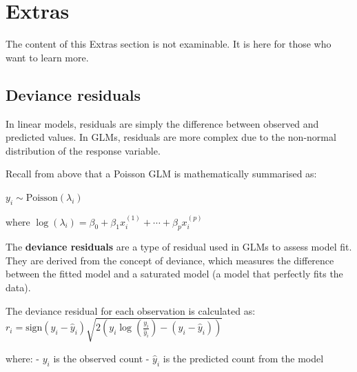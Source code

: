 \documentclass[
  letterpaper,
  8pt,
  a4paper]{book}
\begin{document}
\section*{Extras}\label{extras-6}


\begin{tcolorbox}[enhanced jigsaw, arc=.35mm, bottomrule=.15mm, bottomtitle=1mm, breakable, colback=white, colbacktitle=quarto-callout-note-color!10!white, colframe=quarto-callout-note-color-frame, coltitle=black, left=2mm, leftrule=.75mm, opacityback=0, opacitybacktitle=0.6, rightrule=.15mm, title=\textcolor{quarto-callout-note-color}{\faInfo}\hspace{0.5em}{Note}, titlerule=0mm, toprule=.15mm, toptitle=1mm]

The content of this Extras section is not examinable. It is here for
those who want to learn more.

\end{tcolorbox}

\subsection*{Deviance residuals}\label{deviance-residuals}

In linear models, residuals are simply the difference between observed
and predicted values. In GLMs, residuals are more complex due to the
non-normal distribution of the response variable.

Recall from above that a Poisson GLM is mathematically summarised as:

\(y_i \sim \text{Poisson}(\lambda_i)\)

where
\(\log(\lambda_i) = \beta_0 + \beta_1 x_i^{(1)} + \cdots + \beta_p x_i^{(p)}\)

The \textbf{deviance residuals} are a type of residual used in GLMs to
assess model fit. They are derived from the concept of deviance, which
measures the difference between the fitted model and a saturated model
(a model that perfectly fits the data).

The deviance residual for each observation is calculated as:
\(r_i = \text{sign}(y_i - \hat{y}_i) \sqrt{2 \left( y_i \log\left(\frac{y_i}{\hat{y}_i}\right) - (y_i - \hat{y}_i) \right)}\)

where: - \(y_i\) is the observed count - \(\hat{y}_i\) is the predicted
count from the model
\end{document}
